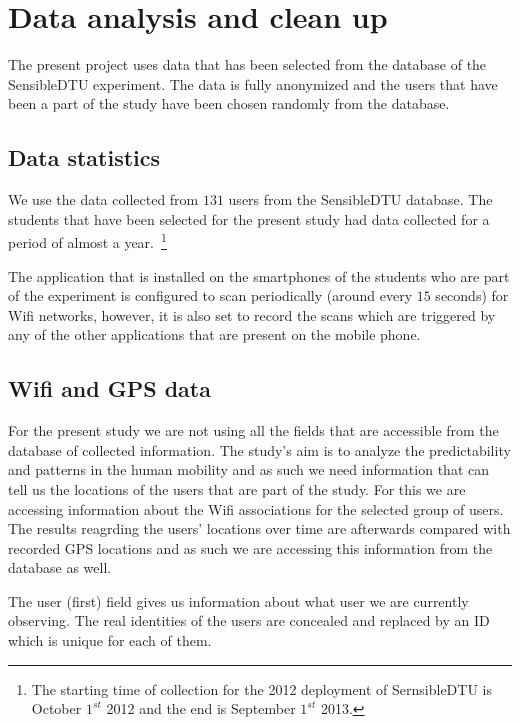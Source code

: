 \chapter{Data analysis and clean up}
The present project uses data that has been selected from the database of the
SensibleDTU experiment. The data is fully anonymized and the users that have
been a part of the study have been chosen randomly from the database.

\section{Data statistics}
We use the data collected from $131$ users from the SensibleDTU database. The
students that have been selected for the present study had data collected for a
period of almost a year.~\footnote{The starting time of collection for the 2012
deployment of SernsibleDTU is October $1^{st}$ 2012 and the end is September
$1^{st}$ 2013.}

The application that is installed on the smartphones of the students who are
part of the experiment is configured to scan periodically (around every $15$
seconds) for Wifi networks, however, it is also set to record the scans which
are triggered by any of the other applications that are present on the mobile
phone.

\section{Wifi and GPS data}
For the present study we are not using all the fields that are accessible from
the database of collected information. The study's aim is to analyze the
predictability and patterns in the human mobility and as such we need
information that can tell us the locations of the users that are part of the
study. For this we are accessing information about the Wifi associations for the
selected group of users. The results reagrding the users' locations over time
are afterwards compared with recorded GPS locations and as such we are accessing
this information from the database as well.


The user (first) field gives us information about what user we are currently
observing. The real identities of the users are concealed and replaced by an ID
which is unique for each of them.

